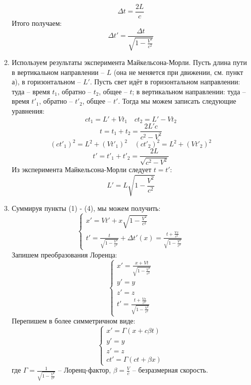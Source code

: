 \documentclass[12pt]{article}
\begin{document}
\begin{enumerate}
\begin{equation}
\Delta t=\frac{2L}{c}
\end{equation}
Итого получаем:
\begin{equation}
\Delta t' = \frac{\Delta t}{\sqrt{1-\frac{V^2}{c^2}}}
\end{equation}
\item Используем результаты эксперимента Майкельсона-Морли. Пусть длина пути в вертикальном направлении -- $L$ (она не меняется при движении, см. пункт а), в горизонтальном -- $L'$. Пусть свет идёт в горизонтальном направлении: туда -- время $t_1$, обратно -- $t_2$, общее -- $t$; в вертикальном направлении: туда -- время $t'_1$, обратно -- $t'_2$, общее -- $t'$. Тогда мы можем записать следующие уравнения:
\begin{equation}
ct_1=L'+Vt_1 \quad ct_2=L'-Vt_2
\end{equation}
\begin{equation}
t = t_1 + t_2 = \frac{2L'c}{c^2-V^2}
\end{equation}
\begin{equation}
(ct'_1)^2 = L^2+(Vt'_1)^2\quad (ct'_2)^2 = L^2+(Vt'_2)^2
\end{equation}
\begin{equation}
t' = t'_1 + t'_2 = \frac{2L}{\sqrt{c^2-V^2}}
\end{equation}
Из эксперимента Майкельсона-Морли следует $t=t'$:
\begin{equation}
L' = L\sqrt{1-\frac{V^2}{c^2}}
\end{equation}
\item Суммируя пункты (1) - (4), мы можем получить:
\begin{equation}
\begin{cases}
x' = Vt'+x\sqrt{1-\frac{V^2}{c^2}}\\
t' = \frac{t}{\sqrt{1-\frac{V^2}{c^2}}}+\Delta t'(x) = \frac{t+\frac{Vx}{c^2}}{\sqrt{1-\frac{V^2}{c^2}}}
\end{cases}
\end{equation}
Запишем преобразования Лоренца:
\begin{equation}
\begin{cases}
x' = \frac{x+Vt}{\sqrt{1-\frac{V^2}{c^2}}}\\
y' = y\\
z' = z\\
t' = \frac{t+\frac{Vx}{c^2}}{\sqrt{1-\frac{V^2}{c^2}}}
\end{cases}
\end{equation}
Перепишем в более симметричном виде:
\begin{equation}
\begin{cases}
x' = \Gamma(x+c\beta t)\\
y' = y\\
z' = z\\
ct' = \Gamma(ct+\beta x)
\end{cases}
\end{equation}
где $\Gamma=\frac{1}{\sqrt{1-\frac{V^2}{c^2}}}$ -- Лоренц-фактор,
$\beta=\frac{V}{c}$ -- безразмерная скорость.
\end{enumerate}
\end{document}
